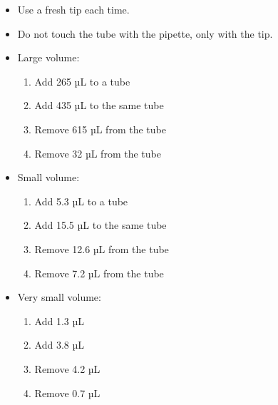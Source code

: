 \documentclass[]{book}
\providecommand{\tightlist}{%
  \setlength{\itemsep}{0pt}\setlength{\parskip}{0pt}}
\theoremstyle{definition}
\theoremstyle{definition}
\theoremstyle{definition}
\theoremstyle{remark}
\begin{document}
\begin{itemize}
\item
  Use a fresh tip each time.
\item
  Do not touch the tube with the pipette, only with the tip.
\item
  Large volume:

  \begin{enumerate}
  \def\labelenumi{\arabic{enumi}.}
  \tightlist
  \item
    Add 265 µL to a tube
  \item
    Add 435 µL to the same tube
  \item
    Remove 615 µL from the tube
  \item
    Remove 32 µL from the tube
  \end{enumerate}
\item
  Small volume:

  \begin{enumerate}
  \def\labelenumi{\arabic{enumi}.}
  \tightlist
  \item
    Add 5.3 µL to a tube
  \item
    Add 15.5 µL to the same tube
  \item
    Remove 12.6 µL from the tube
  \item
    Remove 7.2 µL from the tube
  \end{enumerate}
\item
  Very small volume:

  \begin{enumerate}
  \def\labelenumi{\arabic{enumi}.}
  \tightlist
  \item
    Add 1.3 µL
  \item
    Add 3.8 µL
  \item
    Remove 4.2 µL
  \item
    Remove 0.7 µL
  \end{enumerate}
\end{itemize}
\end{document}
